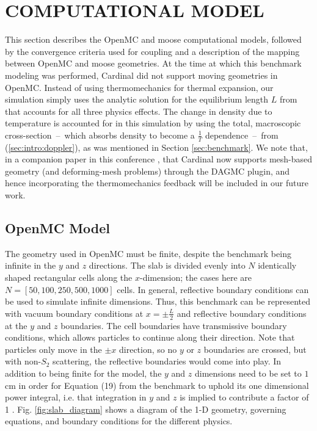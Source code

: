 \documentclass[letterpaper]{mc2023}
\begin{document}
\section{COMPUTATIONAL MODEL}\label{sec:model}
This section describes the OpenMC and \gls{moose} computational models, followed by the convergence criteria used for coupling
and a description of the mapping between OpenMC and \gls{moose} geometries. At the time at which this benchmark modeling was
performed, Cardinal did not support moving geometries in OpenMC. Instead of using thermomechanics for thermal expansion, our
simulation simply uses the analytic solution for the equilibrium length $L$ from \cite{analytical-benchmark} that accounts for
all three physics effects. The change in density due to temperature is accounted for in this simulation by using the total,
macroscopic cross-section\ --\ which absorbs density to become a $\frac{1}{T}$ dependence\ --\ from (\ref{sec:intro:doppler}),
as was mentioned in Section \ref{sec:benchmark}. We note that, in a companion paper in this conference \cite{novak-2023}, that
Cardinal now supports mesh-based geometry (and deforming-mesh problems) through the DAGMC plugin, and hence incorporating the
thermomechanics feedback will be included in our future work.

\subsection{OpenMC Model}
\label{sec:model:OpenMC}
The geometry used in OpenMC must be finite, despite the benchmark being infinite in the $y$ and $z$ directions. The slab
is divided evenly into $N$ identically shaped rectangular cells along the $x$-dimension; the cases here are $N=[50,100,250,500,1000]$
cells. In general, reflective boundary conditions can be used to simulate infinite dimensions. Thus, this benchmark can be
represented with vacuum boundary conditions at $x=\pm \frac{L}{2}$ and reflective boundary conditions at the $y$ and $z$ boundaries.
The cell boundaries have transmissive boundary conditions, which allows particles to continue along their direction. Note that
particles only move in the $\pm x$ direction, so no $y$ or $z$ boundaries are crossed, but with non-$S_{2}$ scattering,
the reflective boundaries would come into play. In addition to being finite for the model, the $y$ and $z$ dimensions need to be
set to $1$ cm in order for Equation (19) from the benchmark to uphold its one dimensional power integral, i.e. that integration in
$y$ and $z$ is implied to contribute a factor of 1 \cite{analytical-benchmark}. Fig. \ref{fig:slab_diagram} shows a diagram
of the 1-D geometry, governing equations, and boundary conditions for the different physics.
\end{document}
